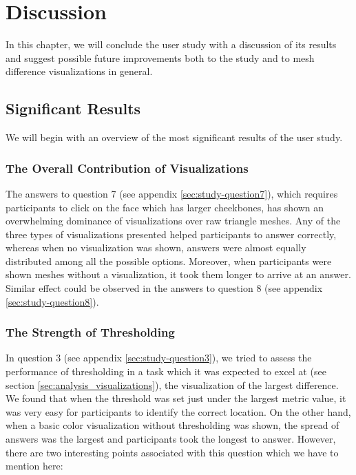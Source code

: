 \chapter{Discussion}

In this chapter, we will conclude the user study with a discussion of its results and suggest possible future improvements both to the study and to mesh difference visualizations in general.

\section{Significant Results}

We will begin with an overview of the most significant results of the user study.

\subsection{The Overall Contribution of Visualizations}

The answers to question 7 (see appendix \ref{sec:study-question7}), which requires participants to click on the face which has larger cheekbones, has shown an overwhelming dominance of visualizations over raw triangle meshes. Any of the three types of visualizations presented helped participants to answer correctly, whereas when no visualization was shown, answers were almost equally distributed among all the possible options. Moreover, when participants were shown meshes without a visualization, it took them longer to arrive at an answer. Similar effect could be observed in the answers to question 8 (see appendix \ref{sec:study-question8}).

\subsection{The Strength of Thresholding}

In question 3 (see appendix \ref{sec:study-question3}), we tried to assess the performance of thresholding in a task which it was expected to excel at (see section \ref{sec:analysis_visualizations}), the visualization of the largest difference. We found that when the threshold was set just under the largest metric value, it was very easy for participants to identify the correct location. On the other hand, when a basic color visualization without thresholding was shown, the spread of answers was the largest and participants took the longest to answer. However, there are two interesting points associated with this question which we have to mention here:

